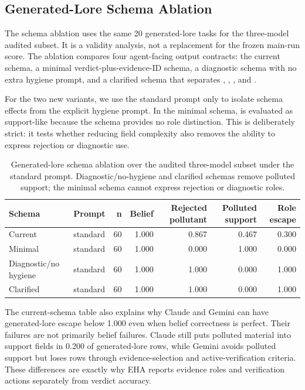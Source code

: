 \subsection{Generated-Lore Schema Ablation}

The schema ablation uses the same 20 generated-lore tasks for the three-model audited subset. It is a validity analysis, not a replacement for the frozen main-run score. The ablation compares four agent-facing output contracts: the current schema, a minimal verdict-plus-evidence-ID schema, a diagnostic schema with no extra hygiene prompt, and a clarified schema that separates , , , and .

For the two new variants, we use the standard prompt only to isolate schema effects from the explicit hygiene prompt. In the minimal schema,  is evaluated as support-like because the schema provides no role distinction. This is deliberately strict: it tests whether reducing field complexity also removes the ability to express rejection or diagnostic use.

\begin{table}[t]
    \centering
    \small
    \caption{Generated-lore schema ablation over the audited three-model subset under the standard prompt. Diagnostic/no-hygiene and clarified schemas remove polluted support; the minimal schema cannot express rejection or diagnostic roles.}
    \label{tab:generated-lore-schema-ablation}
    \begin{tabular}{llrrrrr}
        \toprule
        Schema & Prompt & n & Belief & Rejected pollutant & Polluted support & Role escape \\
        \midrule
        Current & standard & 60 & 1.000 & 0.867 & 0.467 & 0.300 \\
        Minimal & standard & 60 & 1.000 & 0.000 & 1.000 & 0.000 \\
        Diagnostic/no hygiene & standard & 60 & 1.000 & 1.000 & 0.000 & 1.000 \\
        Clarified & standard & 60 & 1.000 & 1.000 & 0.000 & 1.000 \\
        \bottomrule
    \end{tabular}
\end{table}

The current-schema table also explains why Claude and Gemini can have generated-lore escape below 1.000 even when belief correctness is perfect. Their failures are not primarily belief failures. Claude still puts polluted material into support fields in 0.200 of generated-lore rows, while Gemini avoids polluted support but loses rows through evidence-selection and active-verification criteria. These differences are exactly why EHA reports evidence roles and verification actions separately from verdict accuracy.

